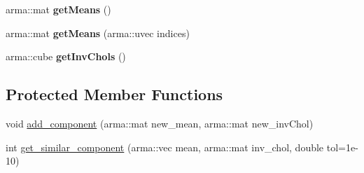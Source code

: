 \begin{DoxyCompactItemize}
\item 
arma\+::mat {\bfseries get\+Means} ()\hypertarget{classSampleDatabase_a1a530510578faadad19e0e6e1c05b327}{}\label{classSampleDatabase_a1a530510578faadad19e0e6e1c05b327}

\item 
arma\+::mat {\bfseries get\+Means} (arma\+::uvec indices)\hypertarget{classSampleDatabase_a5cddca18d77ebe760a7fa1a7cee7b75a}{}\label{classSampleDatabase_a5cddca18d77ebe760a7fa1a7cee7b75a}

\item 
arma\+::cube {\bfseries get\+Inv\+Chols} ()\hypertarget{classSampleDatabase_ac33d23bf20bc1bb9b073f2189da233cd}{}\label{classSampleDatabase_ac33d23bf20bc1bb9b073f2189da233cd}

\end{DoxyCompactItemize}
\subsection*{Protected Member Functions}
\begin{DoxyCompactItemize}
\item 
void \hyperlink{classSampleDatabase_aeeb03252a1ce66585a86efd38f9c0ef5}{add\+\_\+component} (arma\+::mat new\+\_\+mean, arma\+::mat new\+\_\+inv\+Chol)
\item 
int \hyperlink{classSampleDatabase_a4c4704c5cbe83fa5647f36b36528f49f}{get\+\_\+similar\+\_\+component} (arma\+::vec mean, arma\+::mat inv\+\_\+chol, double tol=1e-\/10)
\end{DoxyCompactItemize}
